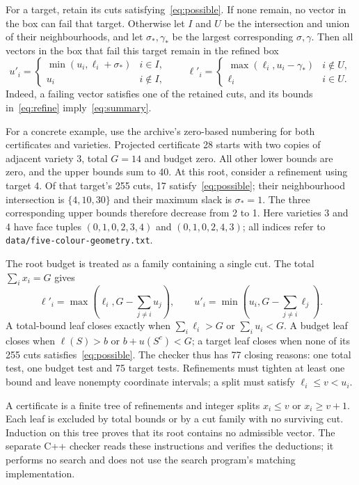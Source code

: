 \documentclass[11pt]{article}
\theoremstyle{remark}
\begin{document}
For a target, retain its cuts satisfying~\eqref{eq:possible}. If none remain,
no vector in the box can fail that target. Otherwise let $I$ and $U$ be the
intersection and union of their neighbourhoods, and let $\sigma_*,\gamma_*$ be the
largest corresponding $\sigma,\gamma$. Then all vectors in the box that fail this
target remain in the refined box
\begin{equation}\label{eq:summary}
 u'_i=\begin{cases}\min(u_i,\ell_i+\sigma_*)&i\in I,\\u_i&i\notin I,\end{cases}
 \qquad
 \ell'_i=\begin{cases}\max(\ell_i,u_i-\gamma_*)&i\notin U,\\\ell_i&i\in U.\end{cases}
\end{equation}
Indeed, a failing vector satisfies one of the retained cuts, and its bounds
in~\eqref{eq:refine} imply~\eqref{eq:summary}.

For a concrete example, use the archive's zero-based numbering for both
certificates and varieties. Projected certificate 28 starts with two copies of adjacent variety 3, total $G=14$ and budget zero.
All other lower bounds are zero, and the upper bounds sum to 40.
At this root, consider a refinement using target 4. Of that target's 255 cuts,
17 satisfy~\eqref{eq:possible}; their neighbourhood intersection is
$\{4,10,30\}$ and their maximum slack is $\sigma_*=1$.
The three corresponding upper bounds therefore decrease from 2 to 1.
Here varieties 3 and 4 have face tuples $(0,1,0,2,3,4)$ and
$(0,1,0,2,4,3)$; all indices refer to \texttt{data/five-colour-geometry.txt}.

The root budget is treated as
a family containing a single cut. The total $\sum_i x_i=G$ gives
\[
 \ell'_i=\max\!\left(\ell_i,G-\sum_{j\ne i}u_j\right),\qquad
 u'_i=\min\!\left(u_i,G-\sum_{j\ne i}\ell_j\right).
\]
A total-bound leaf closes exactly when $\sum_i\ell_i>G$ or
$\sum_i u_i<G$. A budget leaf closes when
$\ell(S)>b$ or $b+u(S^c)<G$; a target leaf closes when none of its
255 cuts satisfies~\eqref{eq:possible}. The checker thus has 77 closing
reasons: one total test, one budget test and 75 target tests. Refinements
must tighten at least one bound and leave
nonempty coordinate intervals; a split must satisfy $\ell_i\le v<u_i$.

A certificate is a finite tree of refinements and integer splits
$x_i\le v$ or $x_i\ge v+1$. Each leaf is excluded by total bounds or by a
cut family with no surviving cut. Induction on this tree proves that its
root contains no admissible vector. The separate C++ checker reads these
instructions and verifies the deductions; it performs no search and does
not use the search program's matching implementation.
\end{document}
